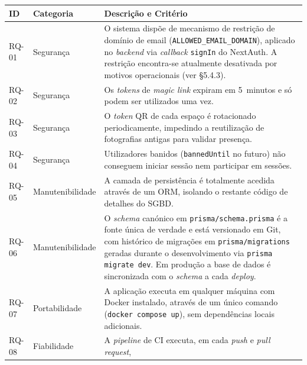 \documentclass[11pt,a4paper]{article}
\begin{document}
\begin{table}[h!]
    \centering
    \footnotesize
    \renewcommand{\arraystretch}{1.3}
    \begin{tabularx}{\linewidth}{@{}llX@{}}
        \toprule
        \textbf{ID} & \textbf{Categoria} & \textbf{Descrição e Critério}     \\
        \midrule
        RQ-01       & Segurança          &
        O sistema dispõe de mecanismo de restrição de domínio de email
        (\texttt{ALLOWED\_EMAIL\_DOMAIN}), aplicado no \emph{backend} via
        \emph{callback} \texttt{signIn} do NextAuth. A restrição encontra-se
        atualmente desativada por motivos operacionais (ver \S5.4.3).        \\
        RQ-02       & Segurança          &
        Os \emph{tokens} de \emph{magic link} expiram em 5~minutos e só podem ser
        utilizados uma vez.                                                  \\
        RQ-03       & Segurança          &
        O \emph{token} QR de cada espaço é rotacionado periodicamente, impedindo a
        reutilização de fotografias antigas para validar presença.           \\
        RQ-04       & Segurança          &
        Utilizadores banidos (\texttt{bannedUntil} no futuro) não conseguem iniciar
        sessão nem participar em sessões.                                    \\
        RQ-05       & Manutenibilidade   &
        A camada de persistência é totalmente acedida através de um ORM, isolando o
        restante código de detalhes do SGBD.                                 \\
        RQ-06       & Manutenibilidade   &
        O \emph{schema} canónico em \texttt{prisma/schema.prisma} é a fonte
        única de verdade e está versionado em Git, com histórico de migrações
        em \texttt{prisma/migrations} geradas durante o desenvolvimento via
        \texttt{prisma migrate dev}. Em produção a base de dados é
        sincronizada com o \emph{schema} a cada \emph{deploy}.               \\
        RQ-07       & Portabilidade      &
        A aplicação executa em qualquer máquina com Docker instalado, através de um
        único comando (\texttt{docker compose up}), sem dependências locais
        adicionais.                                                          \\
        RQ-08       & Fiabilidade        &
        A \emph{pipeline} de CI executa, em cada \emph{push} e \emph{pull request},

\end{tabularx}
\end{table}
\end{document}
